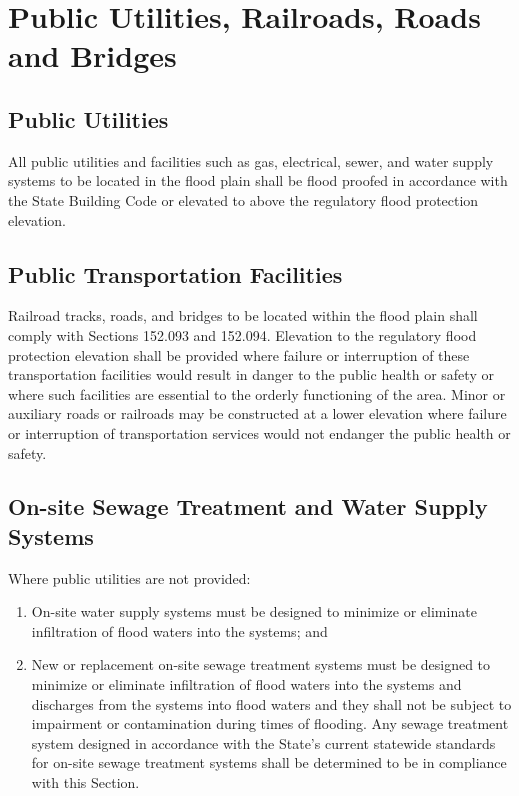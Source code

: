 \section{Public Utilities, Railroads, Roads and Bridges}
\subsection{Public Utilities}
All public utilities and facilities such as gas, electrical, sewer, and water supply systems to be located in the flood plain shall be flood proofed in accordance with the State Building Code or elevated to above the regulatory flood protection elevation.
\subsection{Public Transportation Facilities}
Railroad tracks, roads, and bridges to be located within the flood plain shall comply with Sections 152.093 and 152.094. Elevation to the regulatory flood protection elevation shall be provided where failure or interruption of these transportation facilities would result in danger to the public health or safety or where such facilities are essential to the orderly functioning of the area. Minor or auxiliary roads or railroads may be constructed at a lower elevation where failure or interruption of transportation services would not endanger the public health or safety.
\subsection{On-site Sewage Treatment and Water Supply Systems}
Where public utilities are not provided:
\begin{enumerate}[{\indent}1)]
    \item On-site water supply systems must be designed to minimize or eliminate infiltration of flood waters into the systems; and
    \item New or replacement on-site sewage treatment systems must be designed to minimize or eliminate infiltration of flood waters into the systems and discharges from the systems into flood waters and they shall not be subject to impairment or contamination during times of flooding. Any sewage treatment system designed in accordance with the State's current statewide standards for on-site sewage treatment systems shall be determined to be in compliance with this Section.
\end{enumerate}


